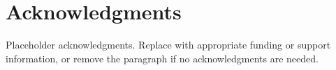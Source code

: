\section{Acknowledgments}
Placeholder acknowledgments. Replace with appropriate funding or support information, or remove
the paragraph if no acknowledgments are needed.
